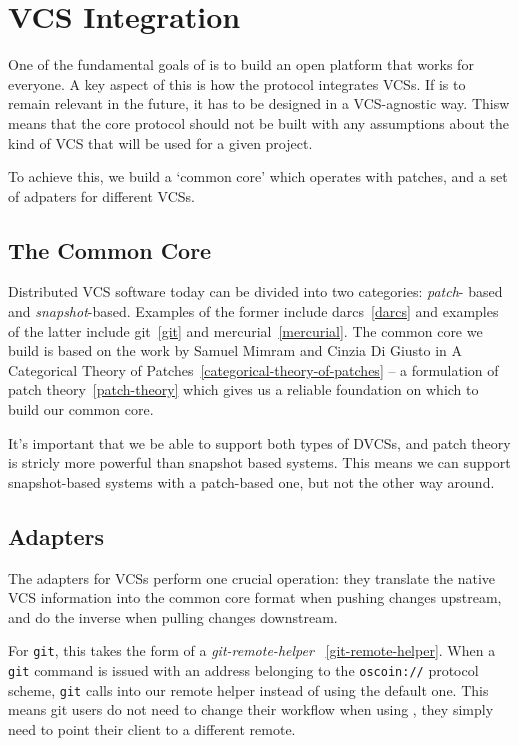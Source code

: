 \section{VCS Integration}

One of the fundamental goals of \oscoin{} is to build an open platform that
works for everyone. A key aspect of this is how the protocol integrates VCSs.
If \oscoin{} is to remain relevant in the future, it has to be designed in a
VCS-agnostic way. Thisw means that the core protocol should not be built
with any assumptions about the kind of VCS that will be used for a given project.

To achieve this, we build a `common core' which operates with patches, and a
set of adpaters for different VCSs.

\subsection{The Common Core}

Distributed VCS software today can be divided into two categories: \emph{patch}-
based and \emph{snapshot}-based. Examples of the former include darcs~\ref{darcs}
and examples of the latter include git~\ref{git} and mercurial~\ref{mercurial}.
The common core we build is based on the work by Samuel Mimram and Cinzia Di
Giusto in A Categorical Theory of Patches~\ref{categorical-theory-of-patches} --
a formulation of patch theory~\ref{patch-theory} which gives us a reliable
foundation on which to build our common core.

It's important that we be able to support both types of DVCSs, and patch theory
is stricly more powerful than snapshot based systems. This means we can support
snapshot-based systems with a patch-based one, but not the other way around.

\subsection{Adapters}

The adapters for VCSs perform one crucial operation: they translate the native
VCS information into the common core format when pushing changes upstream, and
do the inverse when pulling changes downstream.

For \texttt{git}, this takes the form of a \emph{git-remote-helper}~
\ref{git-remote-helper}.  When a \texttt{git} command is issued with an address
belonging to the \texttt{oscoin://} protocol scheme, \texttt{git} calls into
our remote helper instead of using the default one. This means git users
do not need to change their workflow when using \oscoin{}, they simply need
to point their client to a different remote.

